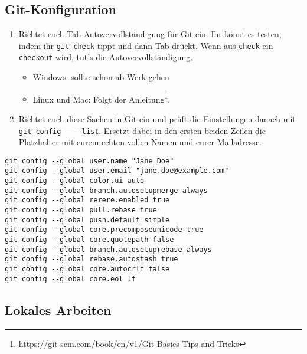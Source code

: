 \documentclass[a4paper,12pt]{scrartcl}
\begin{document}
\subsection{Git-Konfiguration}
\begin{enumerate}
   \item Richtet euch Tab-Autovervollständigung für Git ein. Ihr könnt es testen, indem ihr \texttt{git check} tippt und dann Tab drückt. Wenn aus \texttt{check} ein \texttt{checkout} wird, tut's die Autovervollständigung.
     \begin{itemize}
       \item Windows: sollte schon ab Werk gehen
       \item Linux und Mac: Folgt der Anleitung\footnote{\url{https://git-scm.com/book/en/v1/Git-Basics-Tips-and-Tricks}}.
     \end{itemize}
  \item Richtet euch diese Sachen in Git ein und prüft die Einstellungen danach mit \texttt{git config $--$list}. Ersetzt dabei in den ersten beiden Zeilen die Platzhalter mit eurem echten vollen Namen und eurer Mailadresse.
\end{enumerate}

\begin{verbatim}
git config --global user.name "Jane Doe"
git config --global user.email "jane.doe@example.com"
git config --global color.ui auto
git config --global branch.autosetupmerge always
git config --global rerere.enabled true
git config --global pull.rebase true
git config --global push.default simple
git config --global core.precomposeunicode true
git config --global core.quotepath false
git config --global branch.autosetuprebase always
git config --global rebase.autostash true
git config --global core.autocrlf false
git config --global core.eol lf
\end{verbatim}



\subsection{Lokales Arbeiten}
\end{document}
